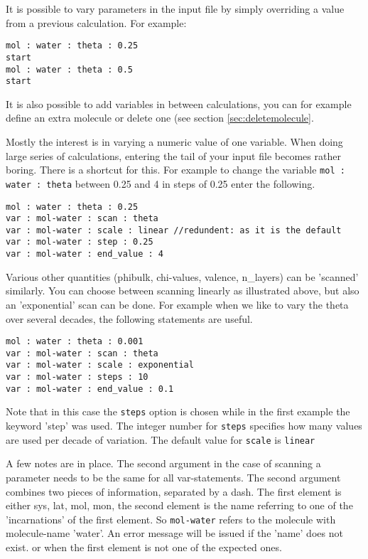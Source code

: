 \documentclass{article}
\begin{document}
It is possible to vary parameters in the input file by simply overriding a value from a previous calculation.  For example:

\begin{verbatim}
mol : water : theta : 0.25
start
mol : water : theta : 0.5
start
\end{verbatim}

It is also possible to add variables in between calculations, you can for example define an extra molecule or delete one (see section \ref{sec:deletemolecule}.  

Mostly the interest is in varying a numeric value of one variable.  When doing large series of calculations, entering the tail of your input file becomes rather boring.  There is a shortcut for this.  For example to change the variable {\tt mol : water : theta} between 0.25 and 4 in steps of 0.25 enter the following.

\begin{verbatim}
mol : water : theta : 0.25
var : mol-water : scan : theta
var : mol-water : scale : linear //redundent: as it is the default 
var : mol-water : step : 0.25
var : mol-water : end_value : 4
\end{verbatim}
Various other quantities (phibulk, chi-values, valence, n\_layers) can be 'scanned' similarly. You can choose between scanning linearly as illustrated above, but also an 'exponential' scan can be done. For example when we like to vary the theta over several decades, the following statements are useful. 
\begin{verbatim}
mol : water : theta : 0.001
var : mol-water : scan : theta
var : mol-water : scale : exponential
var : mol-water : steps : 10
var : mol-water : end_value : 0.1
\end{verbatim}
Note that in this case the {\tt steps} option is chosen while in the first example the keyword 'step' was used.  The integer number for {\tt steps} specifies how many values are used per decade of variation.
The default value for {\tt scale} is {\tt linear}

A few notes are in place. The second argument in the case of scanning a parameter needs to be the same for all var-statements. The second argument combines two pieces of information, separated by a dash. The first element is either sys, lat, mol, mon, the second element is the name referring to one of the 'incarnations' of the first element. So {\tt mol-water} refers to the molecule with molecule-name 'water'. An error message will be issued if the 'name' does not exist. or when the first element is not one of the expected ones.
\end{document}

